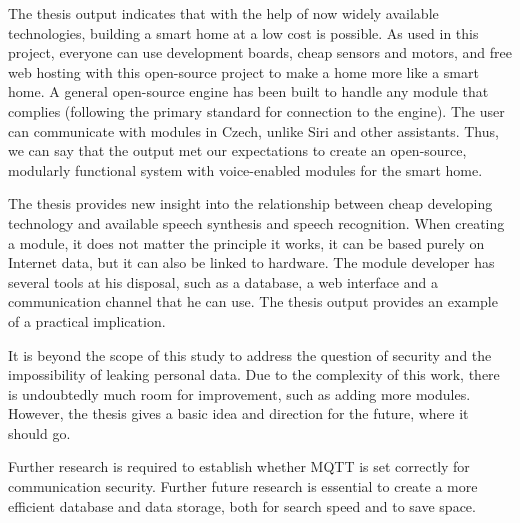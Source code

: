 The thesis output indicates that with the help of now widely available technologies, building a smart home at a low cost is possible. As used in this project, everyone can use development boards, cheap sensors and motors, and free web hosting with this open-source project to make a home more like a smart home. A general open-source engine has been built to handle any module that complies (following the primary standard for connection to the engine). The user can communicate with modules in Czech, unlike Siri and other assistants. Thus, we can say that the output met our expectations to create an open-source, modularly functional system with voice-enabled modules for the smart home.

The thesis provides new insight into the relationship between cheap developing technology and available speech synthesis and speech recognition. When creating a module, it does not matter the principle it works, it can be based purely on Internet data, but it can also be linked to hardware. The module developer has several tools at his disposal, such as a database, a web interface and a communication channel that he can use. The thesis output provides an example of a practical implication. 

It is beyond the scope of this study to address the question of security and the impossibility of leaking personal data. Due to the complexity of this work, there is undoubtedly much room for improvement, such as adding more modules. However, the thesis gives a basic idea and direction for the future, where it should go. 

Further research is required to establish whether MQTT is set correctly for communication security. Further future research is essential to create a more efficient database and data storage, both for search speed and to save space.
